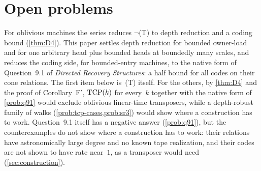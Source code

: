 \section{Open problems}\label{sec:open}

For oblivious machines the series reduces $\neg$(T) to depth reduction and a coding bound (\cref{thm:D4}). This paper settles
depth reduction for bounded owner-load and for one arbitrary head plus bounded heads at boundedly many scales, and reduces the
coding side, for bounded-entry machines, to the native form of Question~9.1 of \emph{Directed Recovery Structures}: a half
bound for all codes on their cone relations. The first item below is~(T) itself. For the others, by \cref{thm:D4} and the
proof of Corollary~F$'$, $\mathrm{TCP}(k)$ for every~$k$ together with the native form of \cref{prob:q91} would exclude oblivious
linear-time transposers, while a depth-robust family of walks (\cref{prob:tcp-cases,prob:sr3}) would show where a
construction has to work. Question~9.1 itself has a negative answer (\cref{prob:q91}), but the counterexamples do not show
where a construction has to work: their relations have astronomically large degree and no known tape realization, and their
codes are not shown to have rate near~$1$, as a transposer would need (\cref{sec:construction}).

